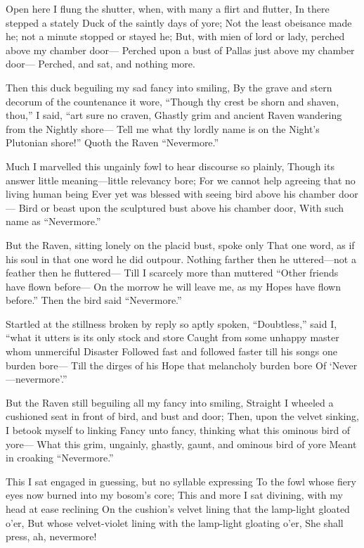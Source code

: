 \documentclass{article}
\begin{document}
    Open here I flung the shutter, when, with many a flirt and flutter,
In there stepped a stately Duck of the saintly days of yore;
    Not the least obeisance made he; not a minute stopped or stayed he;
    But, with mien of lord or lady, perched above my chamber door—
Perched upon a bust of Pallas just above my chamber door—
            Perched, and sat, and nothing more.

Then this duck beguiling my sad fancy into smiling,
By the grave and stern decorum of the countenance it wore,
“Though thy crest be shorn and shaven, thou,” I said, “art sure no craven,
Ghastly grim and ancient Raven wandering from the Nightly shore—
Tell me what thy lordly name is on the Night's Plutonian shore!”
            Quoth the Raven “Nevermore.”

    Much I marvelled this ungainly fowl to hear discourse so plainly,
Though its answer little meaning—little relevancy bore;
    For we cannot help agreeing that no living human being
    Ever yet was blessed with seeing bird above his chamber door—
Bird or beast upon the sculptured bust above his chamber door,
            With such name as ``Nevermore.”

    But the Raven, sitting lonely on the placid bust, spoke only
That one word, as if his soul in that one word he did outpour.
    Nothing farther then he uttered—not a feather then he fluttered—
    Till I scarcely more than muttered ``Other friends have flown before—
On the morrow he will leave me, as my Hopes have flown before.”
            Then the bird said ``Nevermore.”

    Startled at the stillness broken by reply so aptly spoken,
    ``Doubtless,” said I, ``what it utters is its only stock and store
    Caught from some unhappy master whom unmerciful Disaster
    Followed fast and followed faster till his songs one burden bore—
Till the dirges of his Hope that melancholy burden bore
            Of `Never—nevermore'.”

    But the Raven still beguiling all my fancy into smiling,
Straight I wheeled a cushioned seat in front of bird, and bust and door;
    Then, upon the velvet sinking, I betook myself to linking
    Fancy unto fancy, thinking what this ominous bird of yore—
What this grim, ungainly, ghastly, gaunt, and ominous bird of yore
            Meant in croaking ``Nevermore.”

    This I sat engaged in guessing, but no syllable expressing
To the fowl whose fiery eyes now burned into my bosom's core;
    This and more I sat divining, with my head at ease reclining
    On the cushion's velvet lining that the lamp-light gloated o'er,
But whose velvet-violet lining with the lamp-light gloating o'er,
            She shall press, ah, nevermore!
\end{document}
